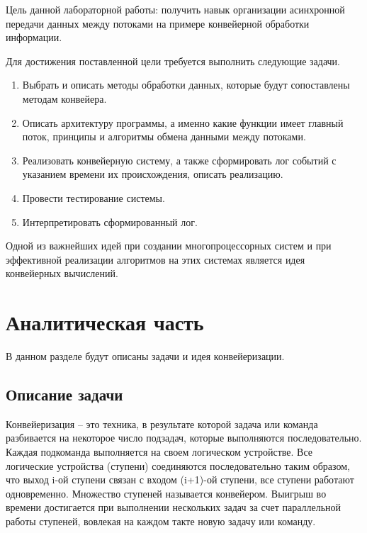 \documentclass[12pt]{report}
\begin{document}
Цель данной лабораторной работы: получить навык организации асинхронной передачи данных между потоками на примере конвейерной обработки информации.
\newline

Для достижения поставленной цели требуется выполнить следующие задачи.
\begin{enumerate}
	\item Выбрать и описать методы обработки данных, которые будут сопоставлены методам конвейера.
	
	\item Описать архитектуру программы, а именно какие функции имеет главный поток, принципы и алгоритмы обмена данными между потоками.
	
	\item Реализовать конвейерную систему, а также сформировать лог событий с указанием времени их происхождения, описать реализацию.
	
	\item Провести тестирование системы.
	
	\item Интерпретировать сформированный лог.
	
\end{enumerate}

Одной из важнейших идей при создании многопроцессорных систем и при эффективной реализации алгоритмов на этих системах является идея конвейерных вычислений.

\chapter{Аналитическая часть}

В данном разделе будут описаны задачи и идея конвейеризации.

\section{Описание задачи}

Конвейеризация – это техника, в результате которой  задача или  команда разбивается  на некоторое число подзадач, которые  выполняются последовательно. Каждая  подкоманда   выполняется на своем логическом  устройстве.    Все     логические    устройства   (ступени)  соединяются последовательно таким образом, что выход  i-ой   ступени   связан   с   входом   (i+1)-ой   ступени,  все ступени  работают  одновременно.  Множество  ступеней называется    конвейером.    Выигрыш     во    времени достигается при  выполнении  нескольких задач  за  счет параллельной   работы   ступеней,  вовлекая  на  каждом такте новую задачу или команду.
\end{document}

